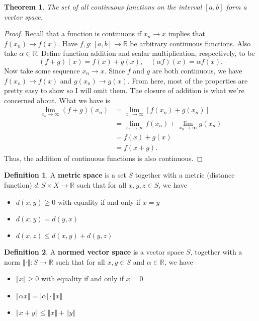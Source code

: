 \documentclass[12pt]{article}
\newcommand{\R}{\mathbb{R}}
\newcommand{\norm}[1]{\left\Vert{#1}\right\Vert}
\newcommand{\abs}[1]{\left\vert{#1}\right\vert}
\newtheorem{theorem}{Theorem}
\theoremstyle{definition}
\newtheorem{definition}{Definition}
\begin{document}
\begin{theorem}
	The set of all continuous functions on the interval $[a,b]$ form a vector space. \label{continuousvs}
\end{theorem}
\begin{proof}
	Recall that a function is continuous if $x_n \rightarrow x$ implies that $f(x_n) \rightarrow f(x)$. Have $f, g :[a,b] \rightarrow \R$ be arbitrary continuous functions. Also take  $\alpha \in\R$. Define function addition and scalar multiplication, respectively, to be
		\[(f + g)(x) = f(x) + g(x), \quad (\alpha f)(x) = \alpha f(x).	\]
		Now take some sequence $x_n \rightarrow x$. Since $f$ and $g$ are both continuous, we have $f(x_n) \rightarrow f(x)$ and $g(x_n) \rightarrow g(x)$. From here, most of the properties are pretty easy to show so I will omit them. The closure of addition is what we're concerned about. What we have is
\begin{align*}
	\lim_{x_n \rightarrow \infty}(f + g)(x_n) &=   \lim_{x_n \rightarrow \infty}[f(x_n) + g(x_n)] \\
		&= \lim_{x_n \rightarrow \infty} f(x_n) + \lim_{x_n \rightarrow \infty}g(x_n)\\
			& = f(x) + g(x)\\
			& = f(x + g).			
\end{align*}
Thus, the addition of continuous functions is also continuous. 
\end{proof}


\begin{definition}
 A \textbf{metric space} is a set $S$ together with a metric (distance function) $d:S \times X \rightarrow \R$ such that for all $x, y, z \in S$, we have
 	\begin{itemize}
 	\itemsep0em
 	\item $d(x,y) \geq 0$ with equality if and only if $x=y$
 	\item $d(x,y)=d(y,x)$
 	\item $d(x,z) \leq d(x,y) + d(y,z)$
 	\end{itemize} 	
\end{definition}

\begin{definition}
	A \textbf{normed vector space} is a vector space $S$, together with a norm $\norm{\cdot} : S \rightarrow \R$ such that for all $x, y \in S$ and $\alpha \in \R$, we have
	\begin{itemize}
		\itemsep0em
		\item $\norm{x} \geq 0$ with equality if and only if $x = 0$
		\item $\norm{\alpha x} = \abs{\alpha} \cdot \norm{x}$
		\item $\norm{x + y} \leq \norm{x} + \norm{y}$
	\end{itemize}
\end{definition}
\end{document}
